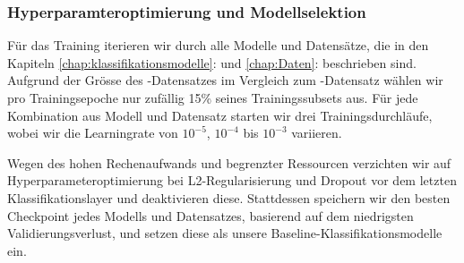 \subsubsection{Hyperparamteroptimierung und Modellselektion}
Für das Training iterieren wir durch alle Modelle und Datensätze, die in den Kapiteln \ref{chap:klassifikationsmodelle}:  und \ref{chap:Daten}:  beschrieben sind. Aufgrund der Grösse des -Datensatzes im Vergleich zum -Datensatz wählen wir pro Trainingsepoche nur zufällig 15\% seines Trainingssubsets aus. Für jede Kombination aus Modell und Datensatz starten wir drei Trainingsdurchläufe, wobei wir die Learningrate von $10^{-5}$, $10^{-4}$ bis $10^{-3}$ variieren. 

Wegen des hohen Rechenaufwands und begrenzter Ressourcen verzichten wir auf Hyperparameteroptimierung bei L2-Regularisierung und Dropout vor dem letzten Klassifikationslayer und deaktivieren diese. Stattdessen speichern wir den besten Checkpoint jedes Modells und Datensatzes, basierend auf dem niedrigsten Validierungsverlust, und setzen diese als unsere Baseline-Klassifikationsmodelle ein.
